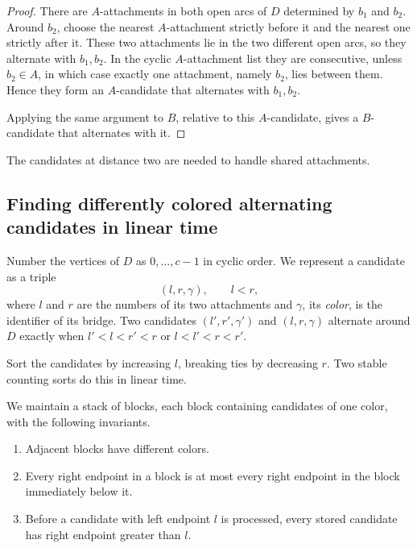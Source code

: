 \documentclass[11pt]{article}
\begin{document}
\begin{proof}
There are $A$-attachments in both open arcs of $D$ determined by $b_1$ and
$b_2$. Around $b_2$, choose the nearest $A$-attachment strictly before it and
the nearest one strictly after it. These two attachments lie in the two
different open arcs, so they alternate with $b_1,b_2$. In the cyclic
$A$-attachment list they are consecutive, unless $b_2\in A$, in which case
exactly one attachment, namely $b_2$, lies between them. Hence they form an
$A$-candidate that alternates with $b_1,b_2$.

Applying the same argument to $B$, relative to this $A$-candidate, gives a
$B$-candidate that alternates with it.
\end{proof}

The candidates at distance two are needed to handle shared attachments.

\subsection{Finding differently colored alternating candidates in linear time}\label{sec:sweep}

Number the vertices of $D$ as $0,\ldots,c-1$ in cyclic order. We represent a
candidate as a triple
\begin{equation*}
(l,r,\gamma),\qquad l<r,
\end{equation*}
where $l$ and $r$ are the numbers of its two attachments and $\gamma$, its
\emph{color}, is the identifier of its bridge. Two candidates $(l',r',\gamma')$
and $(l,r,\gamma)$ alternate around $D$ exactly when $l'<l<r'<r$ or
$l<l'<r<r'$.

Sort the candidates by increasing $l$, breaking ties by decreasing $r$. Two
stable counting sorts do this in linear time.

We maintain a stack of blocks, each block containing candidates of one color,
with the following invariants.
\begin{enumerate}[nosep]
\item Adjacent blocks have different colors.
\item Every right endpoint in a block is at most every right endpoint in the
block immediately below it.
\item Before a candidate with left endpoint $l$ is processed, every stored
candidate has right endpoint greater than $l$.
\end{enumerate}
\end{document}
